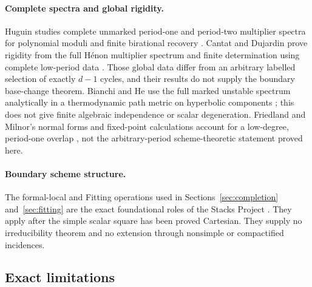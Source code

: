 \documentclass[11pt]{article}
\theoremstyle{definition}
\theoremstyle{remark}
\begin{document}
\paragraph{Complete spectra and global rigidity.}
Huguin studies complete unmarked period-one and period-two multiplier spectra
for polynomial moduli and finite birational recovery \cite{Hug24}.  Cantat
and Dujardin prove rigidity from the full Hénon multiplier spectrum and
finite determination using complete low-period data \cite{CD26}.  Those
global data differ from an arbitrary labelled selection of exactly $d-1$
cycles, and their results do not supply the boundary base-change theorem.
Bianchi and He use the full marked unstable spectrum analytically in a
thermodynamic path metric on hyperbolic components \cite{BH26}; this does not
give finite algebraic independence or scalar degeneration.  Friedland and
Milnor's normal forms and fixed-point calculations account for a
low-degree, period-one overlap \cite{FM89}, not the arbitrary-period
scheme-theoretic statement proved here.

\paragraph{Boundary scheme structure.}
The formal-local and Fitting operations used in
Sections~\ref{sec:completion} and~\ref{sec:fitting} are the exact
foundational roles of the Stacks Project \cite{StacksProject}.  They apply
after the simple scalar square has been proved Cartesian.  They supply no
irreducibility theorem and no extension through nonsimple or compactified
incidences.

\subsection{Exact limitations}
\end{document}
